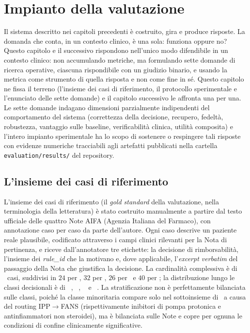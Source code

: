 \chapter{Impianto della valutazione}
\label{ch:impianto}

Il sistema descritto nei capitoli precedenti è costruito, gira e produce
risposte. La domanda che conta, in un contesto clinico, è una sola:
funziona oppure no? Questo capitolo e il successivo rispondono nell'unico modo
difendibile in un contesto clinico: non accumulando metriche, ma
formulando sette domande di ricerca operative, ciascuna rispondibile
con un giudizio binario, e usando la metrica come strumento di quella
risposta e non come fine in sé. Questo capitolo ne fissa il terreno
(l'insieme dei casi di riferimento, il protocollo sperimentale e l'enunciato delle sette domande)
e il capitolo successivo le affronta una per una. Le sette domande indagano dimensioni
parzialmente indipendenti del comportamento del sistema (correttezza
della decisione, recupero, fedeltà, robustezza, vantaggio sulle baseline,
verificabilità clinica, utilità composita) e l'intero impianto
sperimentale ha lo scopo di sostenere o respingere tali risposte con
evidenze numeriche tracciabili agli artefatti pubblicati nella cartella
\texttt{evaluation/results/} del repository.

\section{L'insieme dei casi di riferimento}
\label{sec:gold}

L'insieme dei casi di riferimento (il \emph{gold standard} della valutazione, nella terminologia della letteratura) è stato costruito manualmente a partire dal testo ufficiale delle quattro Note AIFA (Agenzia Italiana del Farmaco), con annotazione caso per caso da parte dell'autore. Ogni caso descrive un paziente reale plausibile, codificato attraverso i campi clinici rilevanti per la Nota di pertinenza, e riceve dall'annotatore tre etichette: la decisione di rimborsabilità, l'insieme dei \emph{rule\_id} che la motivano e, dove applicabile, l'\emph{excerpt verbatim} del passaggio della Nota che giustifica la decisione. La cardinalità complessiva è di \goldn\ casi, suddivisi in $24$ per \notezero, $32$ per \notetredici, $26$ per \notesessanta\ e $40$ per \notenova; la distribuzione lungo le classi decisionali è di \goldRimb\ , \goldNonRimb\ , \goldNonDet\  e \goldRouted\ . La stratificazione non è perfettamente bilanciata sulle classi, poiché la classe minoritaria  compare solo nel sottoinsieme di \notezero\ a causa del routing IPP$\to$FANS (rispettivamente inibitori di pompa protonica e antinfiammatori non steroidei), ma è bilanciata sulle Note e copre per ognuna le condizioni di confine clinicamente significative.


